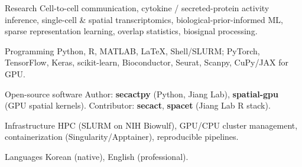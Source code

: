 

\begin{cvskills}

  \cvskill
    {Research} %
    {Cell-to-cell communication, cytokine / secreted-protein activity inference, single-cell \& spatial transcriptomics, biological-prior-informed ML, sparse representation learning, overlap statistics, biosignal processing.}

  \cvskill
    {Programming} %
    {Python, R, MATLAB, LaTeX, Shell/SLURM; PyTorch, TensorFlow, Keras, scikit-learn, Bioconductor, Seurat, Scanpy, CuPy/JAX for GPU.}

  \cvskill
    {Open-source software} %
    {Author: \textbf{secactpy} (Python, Jiang Lab), \textbf{spatial-gpu} (GPU spatial kernels). Contributor: \textbf{secact}, \textbf{spacet} (Jiang Lab R stack).}

  \cvskill
    {Infrastructure} %
    {HPC (SLURM on NIH Biowulf), GPU/CPU cluster management, containerization (Singularity/Apptainer), reproducible pipelines.}

  \cvskill
    {Languages} %
    {Korean (native), English (professional).}

\end{cvskills}
